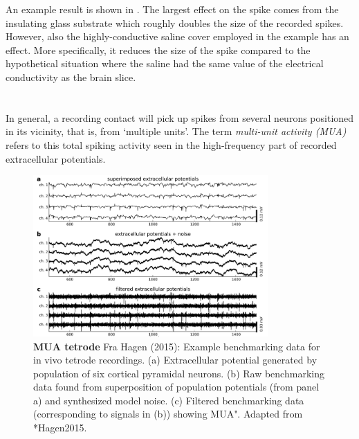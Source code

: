 An example result is shown in .
The largest effect on the spike comes from the insulating glass substrate which roughly doubles the size of the 
recorded spikes. However, also the highly-conductive 
saline cover employed in the example has an effect. More specifically, it
reduces the size of the spike compared to the hypothetical 
situation where the saline had the same value of the electrical conductivity as the brain slice.


\section{}

In general, a recording contact will pick up spikes from several neurons positioned in its vicinity, that is, from `multiple units'.
The term \emph{multi-unit activity (MUA)} refers to this total spiking activity seen in the high-frequency part of recorded extracellular potentials. 

\begin{figure}[!ht]
\begin{center}
\includegraphics[width=0.8\textwidth]{Figures/Spikes/MUA-11}
\end{center}
\caption[]{\textbf{MUA tetrode}
Fra Hagen (2015):
Example benchmarking data for in vivo tetrode recordings. (a) Extracellular potential generated by population of six cortical pyramidal neurons.  
(b) Raw benchmarking data found from superposition of population potentials (from panel a) and synthesized model noise. (c) Filtered benchmarking data (corresponding to signals in (b)) showing MUA". 
Adapted from \citeasnoun**{Hagen2015}.
}
\label{fig:Spikes:MUA-tetrode}
\end{figure}


